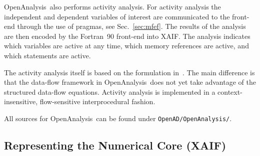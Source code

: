 \documentclass{book}
\newcommand{\OpenAnalysis}{OpenAnalysis}
\newcommand{\xaif}{XAIF}
\newcommand{\refsec}[1]{{Sec.~\ref{#1}}}
\begin{document}
\OpenAnalysis\ also performs activity analysis.  For activity analysis
the independent and dependent variables of interest are communicated
to the front-end through the use of pragmas, see \refsec{sec:mfef}.
The results of the analysis are then encoded by the Fortran~90
front-end into \xaif.  The analysis indicates which variables are
active at any time, which memory references are active, and which
statements are active.

The activity analysis itself is based on the formulation in~\cite{HNP02}.
The main difference is that the data-flow framework in \OpenAnalysis\ does not
yet take advantage of the structured data-flow equations.  Activity analysis is
implemented in a context-insensitive, flow-sensitive interprocedural fashion.

All sources for \OpenAnalysis\ can be found under \lstinline{OpenAD/OpenAnalysis/}.

\subsection{Representing the Numerical Core (\xaif)} \label{sec:xaif}
\end{document}
